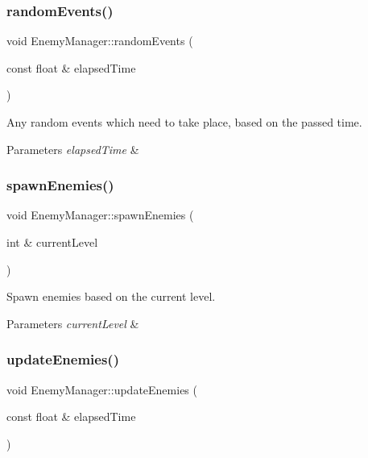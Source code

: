 \subsubsection{\texorpdfstring{random\+Events()}{randomEvents()}}
{\footnotesize\ttfamily void Enemy\+Manager\+::random\+Events (\begin{DoxyParamCaption}\item[{const float \&}]{elapsed\+Time }\end{DoxyParamCaption})}



Any random events which need to take place, based on the passed time. 


\begin{DoxyParams}{Parameters}
{\em elapsed\+Time} & \\
\hline
\end{DoxyParams}
\mbox{\label{class_enemy_manager_a37036db8aad73493103815dc45c6339d}} 
\subsubsection{\texorpdfstring{spawn\+Enemies()}{spawnEnemies()}}
{\footnotesize\ttfamily void Enemy\+Manager\+::spawn\+Enemies (\begin{DoxyParamCaption}\item[{int \&}]{current\+Level }\end{DoxyParamCaption})}



Spawn enemies based on the current level. 


\begin{DoxyParams}{Parameters}
{\em current\+Level} & \\
\hline
\end{DoxyParams}
\mbox{\label{class_enemy_manager_a8a3caf890d121478e41dcc192a8aa4a2}} 
\subsubsection{\texorpdfstring{update\+Enemies()}{updateEnemies()}}
{\footnotesize\ttfamily void Enemy\+Manager\+::update\+Enemies (\begin{DoxyParamCaption}\item[{const float \&}]{elapsed\+Time }\end{DoxyParamCaption})}



